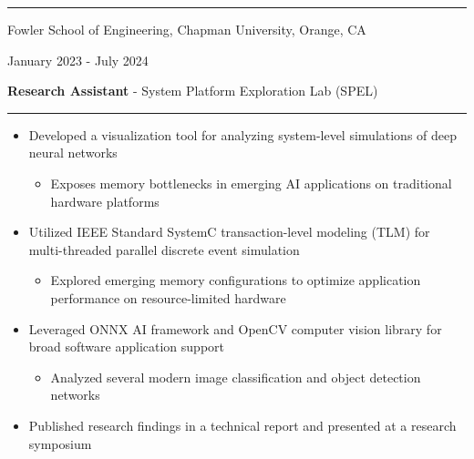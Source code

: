 \documentclass[letter]{article}
\begin{document}
    \vspace{4pt}
    \hrule height 1pt
    \vspace{4pt}
    \noindent
    \begin{minipage}[c]{0.65\linewidth}
        \noindent Fowler School of Engineering, Chapman University, Orange, CA
    \end{minipage}
    \begin{minipage}[c]{0.341\linewidth}
        \begin{flushright}
            January 2023 - July 2024
        \end{flushright}
    \end{minipage}
    \begin{minipage}[c]{0.65\linewidth}
        \noindent \textbf{Research Assistant} - System Platform Exploration Lab (SPEL)
    \end{minipage}
    \noindent
    \vspace{4pt}
    \hrule
    \vspace{4pt}
    \noindent
    \begin{itemize}[noitemsep, topsep=0pt]
        \item Developed a visualization tool for analyzing system-level simulations of deep neural networks
            \begin{itemize}[noitemsep, topsep=0pt]
            \item Exposes memory bottlenecks in emerging AI applications on traditional hardware platforms
            \end{itemize}
        \item Utilized IEEE Standard SystemC transaction-level modeling (TLM) for multi-threaded parallel discrete event simulation
            \begin{itemize}[noitemsep, topsep=0pt]
            \item Explored emerging memory configurations to optimize application performance on resource-limited hardware
            \end{itemize}
        \item Leveraged ONNX AI framework and OpenCV computer vision library for broad software application support
            \begin{itemize}[noitemsep, topsep=0pt]
            \item Analyzed several modern image classification and object detection networks
            \end{itemize}
        \item Published research findings in a technical report and presented at a research symposium
    \end{itemize}
    \medskip
\end{document}
